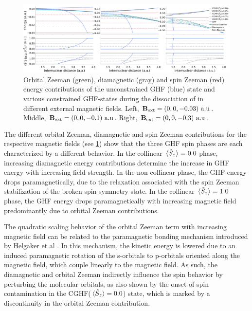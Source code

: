 \documentclass[journal=jctc,manuscript=article]{achemso}
\begin{document}
        \begin{figure}
            \centering
            \includegraphics[width=\textwidth]{C-GHF-energy-contributions(H2)}
            \caption{
                Orbital Zeeman (green), diamagnetic (gray) and spin Zeeman (red) energy contributions of the unconstrained GHF (blue) state and various constrained GHF-states during the dissociation of  in different external magnetic fields.
                Left, $\vb{B}_{\text{ext}} = (0,0,-0.03)\text{ a.u}$.
                Middle, $\vb{B}_{\text{ext}} = (0,0,-0.1)\text{ a.u}$.
                Right, $\vb{B}_{\text{ext}} = (0,0,-0.3)\text{ a.u}$.
            }
            \label{fig:C-GHF-energy-contributions(H2)}
        \end{figure}

        The different orbital Zeeman, diamagnetic and spin Zeeman contributions for the respective magnetic fields (see \cref{fig:C-GHF-energy-contributions(H2)}) show that the three GHF spin phases are each characterized by a different behavior. 
        In the collinear $\ev*{\hat{S}_z}=0.0$ phase, increasing diamagnetic energy contributions determine the increase in GHF energy with increasing field strength. 
        In the non-collinear phase, the GHF energy drops paramagnetically, due to the relaxation associated with the spin Zeeman stabilization of the broken spin symmetry state.
        In the collinear $\ev*{\hat{S}_z}=1.0$ phase, the GHF energy drops paramagnetically with increasing magnetic field predominantly due to orbital Zeeman contributions.
        
        The quadratic scaling behavior of the orbital Zeeman term with increasing magnetic field can be related to the paramagnetic bonding mechanism introduced by Helgaker et al \cite{Lange.2012}. 
        In this mechanism, the kinetic energy is lowered due to an induced paramagnetic rotation of the s-orbitals to p-orbitals oriented along the magnetic field, which couple linearly to the magnetic field. 
        As such, the diamagnetic and orbital Zeeman indirectly influence the spin behavior by perturbing the molecular orbitals, as also shown by the onset of spin contamination in the CGHF($\ev*{\hat{S}_z}=0.0$) state, which is marked by a discontinuity in the orbital Zeeman contribution. 
\end{document}
